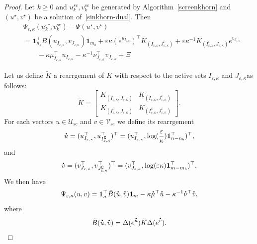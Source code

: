 \newpage
\begin{proof}

Let $k\geq 0$ and $u^{sc}_k, v^{sc}_k$ be generated by Algorithm~\ref{screenkhorn} and $(u^\star, v^\star)$ be a solution of~\ref{sinkhorn-dual}. Then 
\begin{align*}
&\Psi_{\varepsilon, \kappa}(u^{sc}_k,v^{sc}_k) - \Psi(u^\star, v^\star)\\
& = \mathbf1_{n_b}^\top B(u_{I_{\varepsilon,\kappa}}, v_{J_{\varepsilon,\kappa}}) \mathbf 1_{m_b} + \varepsilon \kappa (e^{u_{I_{\varepsilon,\kappa}}})^\top K_{(I_{\varepsilon,\kappa}, J^\complement_{\varepsilon,\kappa})} + \varepsilon \kappa^{-1} K_{(I^\complement_{\varepsilon,\kappa}, J_{\varepsilon,\kappa})}e^{v_{J_{\varepsilon,\kappa}}}\\
&\qquad - \kappa \mu_{I_{\varepsilon,\kappa}}^\top u_{I_{\varepsilon,\kappa}} - \kappa^{-1} \nu_{J_{\varepsilon,\kappa}}^\top v_{J_{\varepsilon,\kappa}} + \Xi
\end{align*}

Let us define $\tilde{K}$ a rearrgement of $K$ with respect to the active sets $I_{\varepsilon,\kappa}$ and $J_{\varepsilon,\kappa}$as follows:
\begin{equation*}
\tilde{K} = 
\begin{bmatrix}
K_{(I_{\varepsilon,\kappa}, J_{\varepsilon,\kappa})} & K_{(I_{\varepsilon,\kappa}, J^\complement_{\varepsilon,\kappa})}\\
K_{(I^\complement_{\varepsilon,\kappa}, J_{\varepsilon,\kappa})} &K_{(I^\complement_{\varepsilon,\kappa}, J^\complement_{\varepsilon,\kappa})}
\end{bmatrix}.
\end{equation*}
For each vectors $u \in \mathcal{U}_{\text{sc}}$ and $v\in \mathcal{V}_{\text{sc}}$ we define its rearrgement 
\begin{equation*}
\dt{u} =(u_{I_{\varepsilon,\kappa}}^\top, u_{I^\complement_{\varepsilon,\kappa}}^\top)^\top = (u_{I_{\varepsilon,\kappa}}^\top, \log(\frac\varepsilon\kappa)\mathbf1_{n- n_b}^\top)^\top,
\end{equation*}
and 
\begin{equation*}
\dt{v} =(v_{J_{\varepsilon,\kappa}}^\top, v_{J^\complement_{\varepsilon,\kappa}}^\top)^\top = (v_{J_{\varepsilon,\kappa}}^\top, \log(\varepsilon\kappa)\mathbf 1_{m- m_b}^\top)^\top.
\end{equation*}
We then have 
\begin{equation*}
\Psi_{\varepsilon, \kappa} (u,v) = \mathbf 1_n^\top \tilde{B}(\dt{u}, \dt{v}) \mathbf 1_m - \kappa \dt{\mu}^\top \dt{u} - \kappa^{-1} \dt{\nu}^\top \dt{v},
\end{equation*}
where
\begin{equation*}
  \tilde{B}(\dt{u}, \dt{v}) = \Delta(e^{\dt{u}})\tilde{K} \Delta(e^{\dt{v}}).
\end{equation*}



\end{proof}
